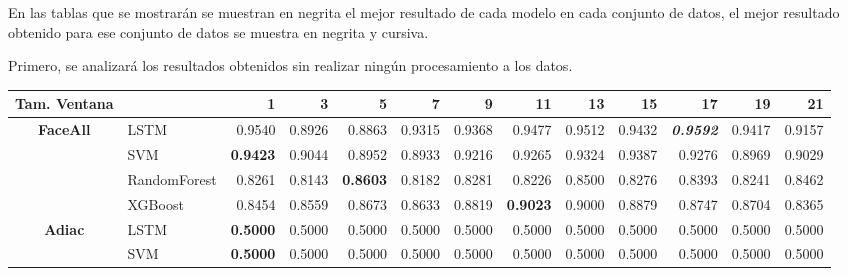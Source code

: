 En las tablas que se mostrarán se muestran en negrita el mejor resultado de cada modelo en cada conjunto de datos, el mejor resultado obtenido para ese conjunto de datos se muestra en negrita y cursiva.\newline

Primero, se analizará los resultados obtenidos sin realizar ningún procesamiento a los datos.\newline

\begin{table}[H]
	\centering
	\begin{adjustbox}{max width=14cm}
		\begin{tabular}{|c|l|r|r|r|r|r|r|r|r|r|r|r|}
			\hline
			\textbf{Tam. Ventana} &              & 1                        & 3               & 5               & 7                        & 9      & 11              & 13     & 15              & 17                       & 19              & 21                       \\
			\hline
			\textbf{FaceAll}      & LSTM         & 0.9540                   & 0.8926          & 0.8863          & 0.9315                   & 0.9368 & 0.9477          & 0.9512 & 0.9432          & \textit{\textbf{0.9592}} & 0.9417          & 0.9157                   \\
			                      & SVM          & \textbf{0.9423}          & 0.9044          & 0.8952          & 0.8933                   & 0.9216 & 0.9265          & 0.9324 & 0.9387          & 0.9276                   & 0.8969          & 0.9029                   \\
			                      & RandomForest & 0.8261                   & 0.8143          & \textbf{0.8603} & 0.8182                   & 0.8281 & 0.8226          & 0.8500 & 0.8276          & 0.8393                   & 0.8241          & 0.8462                   \\
			                      & XGBoost      & 0.8454                   & 0.8559          & 0.8673          & 0.8633                   & 0.8819 & \textbf{0.9023} & 0.9000 & 0.8879          & 0.8747                   & 0.8704          & 0.8365                   \\
			\hline
			\textbf{Adiac}        & LSTM         & \textbf{0.5000}          & 0.5000          & 0.5000          & 0.5000                   & 0.5000 & 0.5000          & 0.5000 & 0.5000          & 0.5000                   & 0.5000          & 0.5000                   \\
			                      & SVM          & \textbf{0.5000}          & 0.5000          & 0.5000          & 0.5000                   & 0.5000 & 0.5000          & 0.5000 & 0.5000          & 0.5000                   & 0.5000          & 0.5000                   \\

\end{tabular}
\end{adjustbox}
\end{table}
